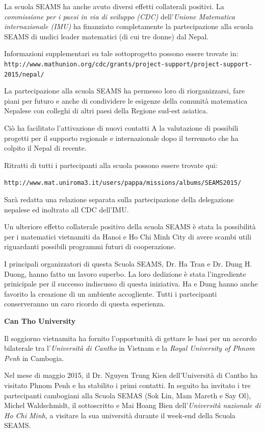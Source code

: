 \documentclass[12pt,a4paper]{letter}
\begin{document}
\begin{letter}
La scuola SEAMS ha anche avuto diversi effetti collaterali positivi. 
La \textit{commissione per i paesi in via di sviluppo (CDC)} dell'\textit{Unione Matematica internazionale (IMU)} 
ha finanziato completamente la partecipazione alla scuola SEAMS di undici leader matematici (di cui tre donne) 
dal Nepal.

Informazioni supplementari su tale sottoprogetto possono essere trovate in:\\
\small{\texttt{http://www.mathunion.org/cdc/grants/project-support/project-support-2015/nepal/}}

La partecipazione alla scuola SEAMS ha permesso loro di riorganizzarsi, fare piani per
futuro e anche di condividere le esigenze della
comunit\`a matematica  Nepalese con colleghi di altri paesi della Regione sud-est asiatica. 

Ci\`o ha facilitato l'attivazione di nuovi contatti A la valutazione di possibili progetti 
per il supporto regionale e internazionale dopo il terremoto che ha colpito il Nepal di recente.

Ritratti di tutti i partecipanti alla scuola possono essere trovate qui:

\small{\texttt{http://www.mat.uniroma3.it/users/pappa/missions/albums/SEAMS2015/}}

Sar\`a redatta una relazione separata sulla partecipazione della delegazione nepalese ed inoltrato all CDC dell'IMU.

Un ulteriore effetto collaterale positivo della scuola SEAMS \`e stata la possibilit\`a
per i matematici vietnamiti da Hanoi e Ho Chi Minh City di avere
scambi utili riguardanti possibili programmi futuri di cooperazione.

I principali organizzatori di questa Scuola SEAMS, Dr. Ha Tran e Dr. Dung H. Duong,
hanno fatto un lavoro superbo. La loro dedizione \`e stata l'ingrediente prinicipale per il successo indiscusso
di questa iniziativa. Ha e Dung hanno anche favorito la creazione di un ambiente accogliente. Tutti i partecipanti
conserveranno un caro ricordo di questa esperienza.\bigskip

\centerline{\Large{\textbf{Can Tho University}}}

Il soggiorno vietnamita ha fornito l'opportunit\`a di gettare le basi per un accordo
bilaterale tra 
l'\textit{Universit\`a di Cantho} in Vietnam e 
la \textit{Royal University of Phnom Penh} in Cambogia.

Nel mese di maggio 2015, il Dr. Nguyen Trung Kien dell'Universit\`a di Cantho ha visitato Phnom Penh e 
ha stabilito i primi contatti. In seguito ha invitato i tre partecipanti cambogiani alla Scuola SEMAS (Sok Lin, Mam Mareth
e Say Ol), 
Michel Waldschmidt, il sottoscritto e Mai Hoang Bien dell'\textit{Universit\`a nazionale di Ho Chi Minh}, 
a visitare la sua universit\`a durante il week-end della Scuola SEAMS.


\end{letter}
\end{document}
